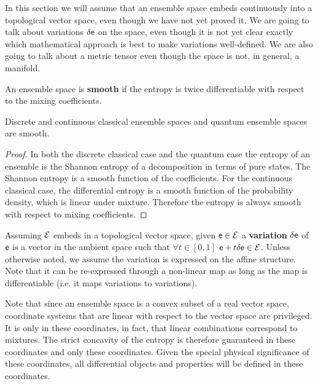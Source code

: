 \begin{mathSection}
\begin{remark}
	In this section we will assume that an ensemble space embeds continuously into a topological vector space, even though we have not yet proved it. We are going to talk about variations $\delta \mathsf{e}$ on the space, even though it is not yet clear exactly which mathematical approach is best to make variations well-defined. We are also going to talk about a metric tensor even though the space is not, in general, a manifold.
\end{remark}
	
\begin{defn}
	An ensemble space is \textbf{smooth} if the entropy is twice differentiable with respect to the mixing coefficients.
\end{defn}

\begin{prop}
	Discrete and continuous classical ensemble spaces and quantum ensemble spaces are smooth.
\end{prop}

\begin{proof}
	In both the discrete classical case and the quantum case the entropy of an ensemble is the Shannon entropy of a decomposition in terms of pure states. The Shannon entropy is a smooth function of the coefficients. For the continuous classical case, the differential entropy is a smooth function of the probability density, which is linear under mixture. Therefore the entropy is always smooth with respect to mixing coefficients.
\end{proof}

\begin{defn}
	Assuming $\mathcal{E}$ embeds in a topological vector space, given $\mathsf{e} \in \mathcal{E}$ a \textbf{variation} $\delta \mathsf{e}$ of $\mathsf{e}$ is a vector in the ambient space such that $\forall t \in [0,1]$ $\mathsf{e} + t \delta \mathsf{e} \in \mathcal{E}$. Unless otherwise noted, we assume the variation is expressed on the affine structure. Note that it can be re-expressed through a non-linear map as long as the map is differentiable (i.e. it maps variations to variations).
\end{defn}

\begin{remark}
	Note that since an ensemble space is a convex subset of a real vector space, coordinate systems that are linear with respect to the vector space are privileged. It is only in these coordinates, in fact, that linear combinations correspond to mixtures. The strict concavity of the entropy is therefore guaranteed in these coordinates and only these coordinates. Given the special physical significance of these coordinates, all differential objects and properties will be defined in these coordinates.
\end{remark}


\end{mathSection}
